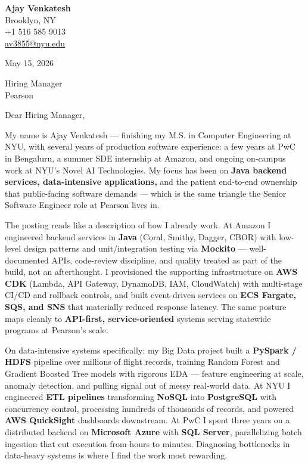 \documentclass[letterpaper,11pt]{article}
\begin{document}
\begin{flushleft}
\textbf{\large Ajay Venkatesh} \\
Brooklyn, NY \\
+1 516 585 9013 \\
\href{mailto:av3855@nyu.edu}{av3855@nyu.edu}
\end{flushleft}

\vspace{10pt}

May 15, 2026

\vspace{6pt}

Hiring Manager \\
Pearson

\vspace{10pt}

Dear Hiring Manager,

My name is Ajay Venkatesh --- finishing my M.S. in Computer Engineering at NYU, with several years of production software experience: a few years at PwC in Bengaluru, a summer SDE internship at Amazon, and ongoing on-campus work at NYU's Novel AI Technologies. My focus has been on \textbf{Java backend services, data-intensive applications,} and the patient end-to-end ownership that public-facing software demands --- which is the same triangle the Senior Software Engineer role at Pearson lives in.

The posting reads like a description of how I already work. At Amazon I engineered backend services in \textbf{Java} (Coral, Smithy, Dagger, CBOR) with low-level design patterns and unit/integration testing via \textbf{Mockito} --- well-documented APIs, code-review discipline, and quality treated as part of the build, not an afterthought. I provisioned the supporting infrastructure on \textbf{AWS CDK} (Lambda, API Gateway, DynamoDB, IAM, CloudWatch) with multi-stage CI/CD and rollback controls, and built event-driven services on \textbf{ECS Fargate, SQS, and SNS} that materially reduced response latency. The same posture maps cleanly to \textbf{API-first, service-oriented} systems serving statewide programs at Pearson's scale.

On data-intensive systems specifically: my Big Data project built a \textbf{PySpark / HDFS} pipeline over millions of flight records, training Random Forest and Gradient Boosted Tree models with rigorous EDA --- feature engineering at scale, anomaly detection, and pulling signal out of messy real-world data. At NYU I engineered \textbf{ETL pipelines} transforming \textbf{NoSQL} into \textbf{PostgreSQL} with concurrency control, processing hundreds of thousands of records, and powered \textbf{AWS QuickSight} dashboards downstream. At PwC I spent three years on a distributed backend on \textbf{Microsoft Azure} with \textbf{SQL Server}, parallelizing batch ingestion that cut execution from hours to minutes. Diagnosing bottlenecks in data-heavy systems is where I find the work most rewarding.
\end{document}
